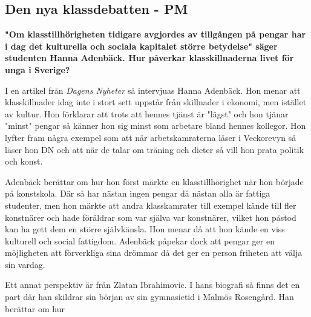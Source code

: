 \subsection{Den nya klassdebatten - PM}

\textbf{"Om klasstillhörigheten tidigare avgjordes av tillgången på pengar har i dag det kulturella och sociala kapitalet större betydelse" säger studenten Hanna Adenbäck. Hur påverkar klasskillnaderna livet för unga i Sverige?}

I en artikel från \textit{Dagens Nyheter} så intervjuas Hanna Adenbäck. Hon menar att klasskillnader idag inte i stort sett uppstår från skillnader i ekonomi, men istället av kultur. Hon förklarar att trots att hennes tjänst är "lägst" och hon tjänar "minst" pengar så känner hon sig minst som arbetare bland hennes kollegor. Hon lyfter fram några exempel som att när arbetskamraterna läser i Veckorevyn så läser hon DN och att när de talar om träning och dieter så vill hon prata politik och konst. 

Adenbäck berättar om hur hon först märkte en klasstillhörighet när hon började på konstskola. Där så har nästan ingen pengar då nästan alla är fattiga studenter, men hon märkte att andra klasskamrater till exempel kände till fler konstnärer och hade föräldrar som var själva var konstnärer, vilket hon påstod kan ha gett dem en större självkänsla. Hon menar då att hon kände en viss kulturell och social fattigdom. Adenbäck påpekar dock att pengar ger en möjligheten att förverkliga sina drömmar då det ger en person friheten att välja sin vardag.

Ett annat perspektiv är från Zlatan Ibrahimovic. I hans biografi så finns det en part där han skildrar sin början av sin gymnasietid i Malmös Rosengård. Han berättar om hur 

